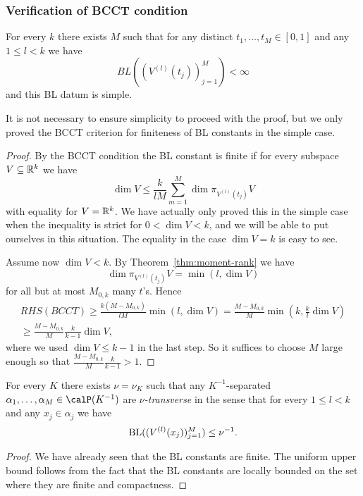 \subsubsection{Verification of BCCT condition}
\begin{corollary}
For every $k$ there exists $M$ such that for any distinct $t_{1},\dotsc,t_{M} \in [0,1]$ and any $1 \leq l < k$ we have
\[
BL((V^{(l)}(t_{j}))_{j=1}^{M}) < \infty
\]
and this BL datum is simple.
\end{corollary}
It is not necessary to ensure simplicity to proceed with the proof, but we only proved the BCCT criterion for finiteness of BL constants in the simple case.
\begin{proof}
By the BCCT condition the BL constant is finite if for every subspace $V \subseteq \mathbb{R}^{k}$ we have
\begin{equation}
\tag{BCCT}
\dim V \leq \frac{k}{l M} \sum_{m=1}^{M} \dim \pi_{V^{(l)}(t_{j})} V
\end{equation}
with equality for $V=\mathbb{R}^{k}$.
We have actually only proved this in the simple case when the inequality is strict for $0 < \dim V < k$, and we will be able to put ourselves in this situation.
The equality in the case $\dim V = k$ is easy to see.

Assume now $\dim V < k$.
By Theorem~\ref{thm:moment-rank} we have
\[
\dim \pi_{V^{(l)}(t_{j})} V = \min(l, \dim V)
\]
for all but at most $M_{0,k}$ many $t$'s.
Hence
\begin{multline*}
RHS(BCCT) \geq
\frac{k (M-M_{0,k})}{l M} \min(l, \dim V)
=
\frac{M-M_{0,k}}{M} \min(k, \frac{k}{l} \dim V)\\
\geq
\frac{M-M_{0,k}}{M} \frac{k}{k-1} \dim V,
\end{multline*}
where we used $\dim V \leq k-1$ in the last step.
So it suffices to choose $M$ large enough so that $\frac{M-M_{0,k}}{M} \frac{k}{k-1} > 1$.
\end{proof}

\begin{corollary}
\label{cor:not-clustered-implies-transverse}
For every $K$ there exists $\nu=\nu_{K}$ such that any $K^{-1}$-separated $\alpha_1, \dotsc, \alpha_M \in \Part{K^{-1}}$ are \emph{$\nu$-transverse} in the sense that for every $1 \leq l < k$ and any $x_{j} \in \alpha_{j}$ we have
\[
\mathrm{BL}((V^{(l)}(x_{j}))_{j=1}^{M})
\leq \nu^{-1}.
\]
\end{corollary}
\begin{proof}
We have already seen that the BL constants are finite.
The uniform upper bound follows from the fact that the BL constants are locally bounded on the set where they are finite and compactness.
\end{proof}

